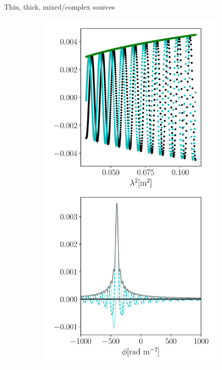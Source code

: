 \documentclass[xetex,aspectratio=169]{beamer}
\begin{document}
\begin{frame}{Thin, thick, mixed/complex sources}

	\begin{figure}
		\centering

		\begin{subfigure}{0.2\textwidth}
			\includegraphics[width=\textwidth]{figures/sources/thin_source.pdf}

\end{subfigure}
\end{figure}
\end{frame}
\end{document}

